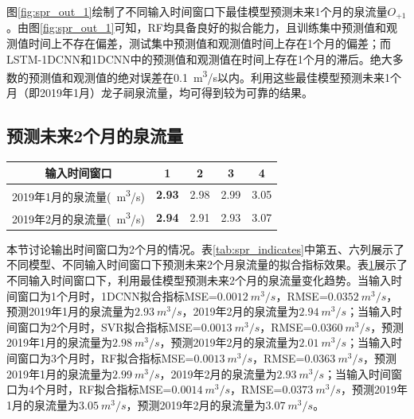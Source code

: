 图\ref{fig:spr_out_1}绘制了不同输入时间窗口下最佳模型预测未来1个月的泉流量$O_{+1}$。由图\ref{fig:spr_out_1}可知，RF均具备良好的拟合能力，且训练集中预测值和观测值时间上不存在偏差，测试集中预测值和观测值时间上存在1个月的偏差；而LSTM-1DCNN和1DCNN中的预测值和观测值在时间上存在1个月的滞后。绝大多数的预测值和观测值的绝对误差在\SI{0.1}{m^{3}/s}以内。利用这些最佳模型预测未来1个月（即2019年1月）龙子祠泉流量，均可得到较为可靠的结果。

\subsection{预测未来2个月的泉流量}\label{sec:spr_two}

\begin{table}[!htbp]
  \centering
  \label{tab:spr_two}
  \footnotesize
  \begin{tabular}{ccccc}
    \toprule
    输入时间窗口 & 1 & 2 & 3 & 4\\
    \midrule
    2019年1月的泉流量(\SI{}{m^{3}/s})& \textbf{2.93} & 2.98 & 2.99 & 3.05 \\
      2019年2月的泉流量(\SI{}{m^{3}/s})& \textbf{2.94} & 2.91 & 2.93 & 3.07 \\
    \bottomrule
  \end{tabular}
\end{table}

本节讨论输出时间窗口为2个月的情况。表\ref{tab:spr_indicates}中第五、六列展示了不同模型、不同输入时间窗口下预测未来2个月泉流量的拟合指标效果。表\ref{tab:spr_two}展示了不同输入时间窗口下，利用最佳模型预测未来2个月的泉流量变化趋势。当输入时间窗口为1个月时，1DCNN拟合指标MSE=$\SI{0.0012}{m^{3}/s}$，RMSE=$\SI{0.0352}{m^{3}/s}$，预测2019年1月的泉流量为$\SI{2.93}{m^{3}/s}$，2019年2月的泉流量为$\SI{2.94}{m^{3}/s}$；当输入时间窗口为2个月时，SVR拟合指标MSE=$\SI{0.0013}{m^{3}/s}$，RMSE=$\SI{0.0360}{m^{3}/s}$，预测2019年1月的泉流量为$\SI{2.98}{m^{3}/s}$，预测2019年2月的泉流量为$\SI{2.01}{m^{3}/s}$；当输入时间窗口为3个月时，RF拟合指标MSE=$\SI{0.0013}{m^{3}/s}$，RMSE=$\SI{0.0363}{m^{3}/s}$，预测2019年1月的泉流量为$\SI{2.99}{m^{3}/s}$，2019年2月的泉流量为$\SI{2.93}{m^{3}/s}$；当输入时间窗口为4个月时，RF拟合指标MSE=$\SI{0.0014}{m^{3}/s}$，RMSE=$\SI{0.0373}{m^{3}/s}$，预测2019年1月的泉流量为$\SI{3.05}{m^{3}/s}$，预测2019年2月的泉流量为$\SI{3.07}{m^{3}/s}$。


